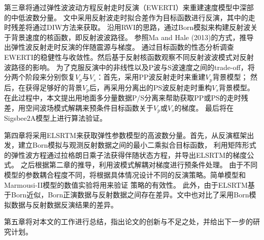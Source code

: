 第三章将通过弹性波波动方程反射走时反演（EWERTI）来重建速度模型中深部的中低波数分量。
文中采用反射波走时拟合差作为目标函数进行反演，其中的走时残差将通过DIW方法来获取。
沿用RWI的思路，通过Born模拟来构建反射波关于背景速度的核函数，即反射波波路径。
参照Ma and Hale (2013)\cite{ma2013}的方式，推导出弹性波反射走时反演的伴随震源与梯度。
通过目标函数的性态分析调查EWERTI的稳健性与收敛性。然后基于反射核函数观察不同反射波波模式对反射波路径的影响。
为了克服反演中的非线性以及P波与S波速度之间的trade-off，将分两个阶段来分别恢复$V_p$与$V_s$：首先，采用PP波反射走时来重建$V_p$背景模型；
然后，在获得足够好的背景$V_p$后，再采用分离出的PS波反射走时重构$V_s$背景模型。
在此过程中，本文提出用地面多分量数据P/S分离来帮助获取PP或PS的走时残差，用空间波场模式解耦来预条件目标函数关于$V_p$或$V_s$的梯度。
最后将在Sigsbee2A模型上进行算法验证。

第四章将采用ELSRTM来获取弹性参数模型的高波数分量。首先，从反演框架出发，建立Born模拟与观测反射数据之间的最小二乘拟合目标函数，
利用矩阵形式的弹性波方程通过拉格朗日乘子法获得伴随状态方程，并导出ELSRTM的梯度公式。
之后根据第二章的推导，利用波模式解耦对梯度进行预条件处理。
由于不同模型的参数耦合程度不同，将根据具体情况设计不同的反演策略。简单模型和Marmousi-II模型的数值实验将用来验证
策略的有效性。
此外，由于ELSRTM基于Born近似，Born正演数据与反射数据之间存在差异。文中也对比了采用Born模拟数据与反射数据反演结果的差异。

第五章将对本文的工作进行总结，指出论文的创新与不足之处，并给出下一步的研究计划。
